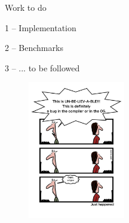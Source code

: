 \documentclass[10pt]{beamer}
\begin{document}
\begin{frame}{Work to do}{}
\begin{minipage}{0.5\textwidth}
 \begin{block}
 	{1 -- Implementation}
  \end{block}
  \begin{block}
  	{2 -- Benchmarks}
  \end{block}
  \begin{block}
  	{3 -- ... to be followed}
  \end{block}
\end{minipage}
\begin{minipage}{0.4\textwidth}
\begin{figure}[h]
	\includegraphics[height=6cm]{img/bug}
\end{figure}
\end{minipage}
\end{frame}


{\finalbg
\begin{frame}
\end{frame}}
\end{document}
